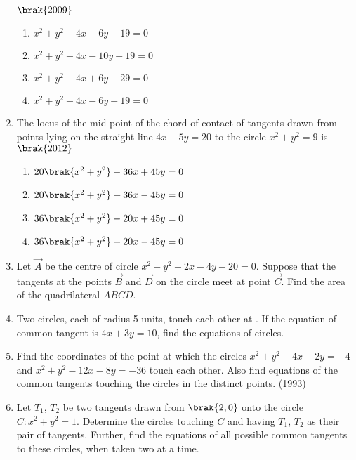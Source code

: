 \begin{enumerate}[label=\thesubsection.\arabic*.,ref=\thesubsection.\theenumi]
             \hfill$\brak{2009}$
\begin{multicols}{2}
\begin{enumerate}
             \item $x^2+y^2+4x-6y+19=0$
             \item $x^2+y^2-4x-10y+19=0$
             \item $x^2+y^2-4x+6y-29=0$
             \item $x^2+y^2-4x-6y+19=0$
             \end{enumerate}
\end{multicols}
             \item The locus of the mid-point of the chord of contact of tangents drawn from points lying on the straight line $4x-5y=20$ to the circle $x^2+y^2=9$ is
                 \hfill$\brak{2012}$
\begin{multicols}{2}
\begin{enumerate}
                 \item $20\brak{x^2+y^2}-36x+45y=0$
                 \item $20\brak{x^2+y^2}+36x-45y=0$
                 \item $36\brak{x^2+y^2}-20x+45y=0$
                 \item $36\brak{x^2+y^2}+20x-45y=0$
             \end{enumerate}
             \end{multicols}
\item Let $\vec{A}$ be the centre of circle $x^2+y^2-2x-4y-20=0$. Suppose that the tangents at the points $\vec{B}$ and $\vec{D}$ on the circle meet at point $\vec{C}$. Find the area of the quadrilateral $ABCD$.
%
\hfill {}
\item Two circles,  each of radius 5 units,  touch each other at . If the equation of common tangent is $4x+3y=10$,  find the equations of circles.
%
\hfill {}
\item Find the coordinates of the point at which the circles $x^2+y^2-4x-2y=-4$ and $x^2+y^2-12x-8y=-36$ touch each other. Also find equations of the common tangents touching the circles in the distinct points.                        
%
\hfill(1993)
%
\item Let $T_{1}$,  $T_{2}$ be two tangents drawn from $\brak{2, 0}$ onto the circle $C :x^2+y^2=1$. Determine the circles touching $C$ and having $T_{1}$,  $T_{2}$ as their pair of tangents. Further,  find the equations of all possible common tangents to these circles,  when taken two at a time.


\end{enumerate}
